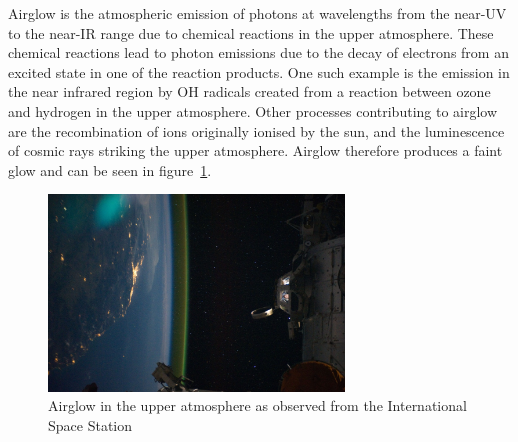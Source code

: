 		Airglow is the atmospheric emission of photons at wavelengths from the near-UV to the near-IR range due to chemical reactions in the upper atmosphere\cite[p.~9]{An_atmospheric_radiation_model_for_Cerro_Paranal}. These chemical reactions lead to photon emissions due to the decay of electrons from an excited state in one of the reaction products. One such example is the emission in the near infrared region by OH radicals created from a reaction between ozone and hydrogen in the upper atmosphere\cite[p.~1]{MNRMNR11383}. Other processes contributing to airglow are the recombination of ions originally ionised by the sun, and the luminescence of cosmic rays striking the upper atmosphere. Airglow therefore produces a faint glow and can be seen in figure~\ref{fig:air_glow_in_upper_atmosphere}.
		\begin{figure}[!htb]
			\centering
			\includegraphics[width=0.7\textwidth]{../Images/airglow_in_upper_atmosphere.jpeg}
			\caption{Airglow in the upper atmosphere as observed from the International Space Station\cite{ISS028_E_050185}}\label{fig:air_glow_in_upper_atmosphere}
		\end{figure}

